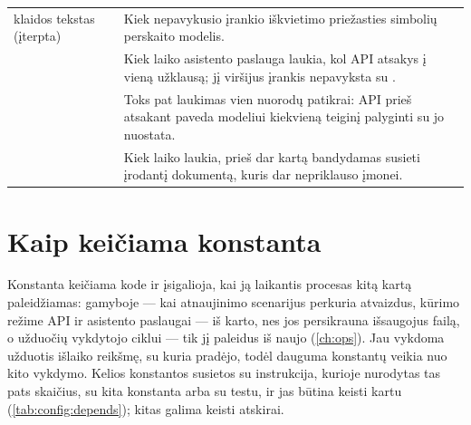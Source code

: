 \begin{xltabular}{\textwidth}{@{}L{44mm}L{19mm}Y@{}}
klaidos tekstas (įterpta) &  & Kiek nepavykusio įrankio iškvietimo priežasties simbolių perskaito modelis. \\
 &  & Kiek laiko asistento paslauga laukia, kol API atsakys į vieną užklausą; jį viršijus įrankis nepavyksta su . \\
 &  & Toks pat laukimas vien nuorodų patikrai: API prieš atsakant paveda modeliui kiekvieną teiginį palyginti su jo nuostata. \\
 &  & Kiek laiko  laukia, prieš dar kartą bandydamas susieti įrodantį dokumentą, kuris dar nepriklauso įmonei. \\
\end{xltabular}


\section{Kaip keičiama konstanta}\label{sec:config:change}

Konstanta keičiama kode ir įsigalioja, kai ją laikantis procesas kitą kartą paleidžiamas:
gamyboje --- kai atnaujinimo scenarijus perkuria atvaizdus, kūrimo režime API ir asistento
paslaugai --- iš karto, nes jos persikrauna išsaugojus failą, o užduočių vykdytojo ciklui ---
tik jį paleidus iš naujo (\cref{ch:ops}). Jau vykdoma užduotis išlaiko reikšmę, su kuria
pradėjo, todėl dauguma konstantų veikia nuo kito vykdymo. Kelios konstantos susietos su
instrukcija, kurioje nurodytas tas pats skaičius, su kita konstanta arba su testu, ir jas būtina
keisti kartu (\cref{tab:config:depends}); kitas galima keisti atskirai.

